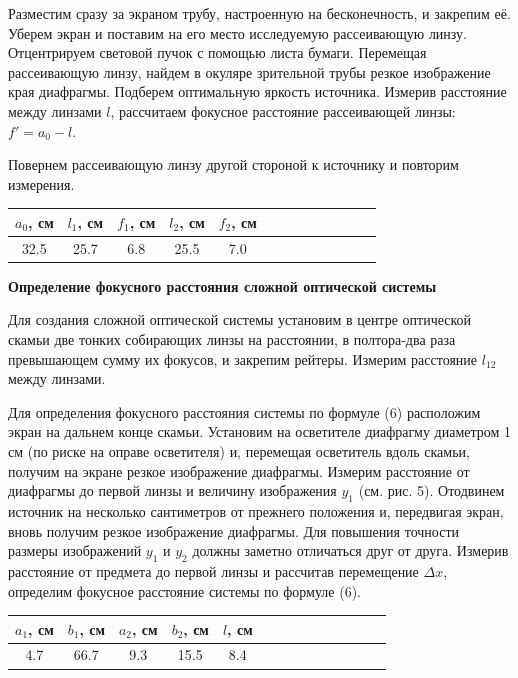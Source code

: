 \documentclass[14pt]{article}
\begin{document}
Разместим сразу за экраном трубу, настроенную на бесконечность,
и закрепим её. Уберем экран и поставим на его место исследуемую
рассеивающую линзу. Отцентрируем световой пучок с помощью листа
бумаги. Перемещая рассеивающую линзу, найдем в окуляре зрительной
трубы резкое изображение края диафрагмы.
Подберем оптимальную яркость источника.
Измерив расстояние между линзами $l$, рассчитаем фокусное расстояние
рассеивающей линзы:
$f' = a_0 − l$.

Повернем рассеивающую линзу другой стороной
к источнику
и повторим
измерения.

\begin{center}
\begin{tabular}{|c|c|c|c|c|c|c|c|c|c|c|c|c|}
\hline
$a_0$, см	&	$l_1$, см	&	$f_1$, см	&	$l_2$, см	&	$f_2$, см	\\
\hline
32.5		&	25.7		&	6.8			&	25.5		&	7.0			\\
\hline
\end{tabular}
\end{center}


\vspace{1cm}
\textbf{Определение фокусного расстояния сложной оптической системы}

Для создания сложной оптической системы
установим в центре оптической
скамьи две тонких собирающих линзы на расстоянии, в полтора-два
раза превышающем сумму их фокусов,
и закрепим рейтеры. Измерим расстояние $l_{12}$ между линзами.

Для определения фокусного расстояния системы по формуле (6) расположим
экран на дальнем конце скамьи.
Установим на осветителе диафрагму диаметром 1 см (по риске на
оправе осветителя) и, перемещая осветитель вдоль скамьи, получим
на экране резкое изображение диафрагмы. Измерим расстояние от диафрагмы
до первой линзы и величину изображения $y_1$ (см. рис. 5).
Отодвинем источник на несколько сантиметров от прежнего положения
и, передвигая экран, вновь получим резкое изображение диафрагмы.
Для повышения точности размеры изображений
$y_1$ и
$y_2$ должны
заметно отличаться друг от друга. Измерив расстояние от предмета до
первой линзы
и рассчитав перемещение
$\Delta x$, определим фокусное расстояние
системы по формуле (6).

\begin{center}
\begin{tabular}{|c|c|c|c|c|c|c|c|c|c|c|c|c|c|}
\hline
$a_1$, см	&	$b_1$, см	&	$a_2$, см	&	$b_2$, см	&	$l$, см		\\
\hline
4.7			&	66.7		&	9.3			&	15.5		&	8.4			\\
\hline
\end{tabular}
\end{center}
\end{document}
